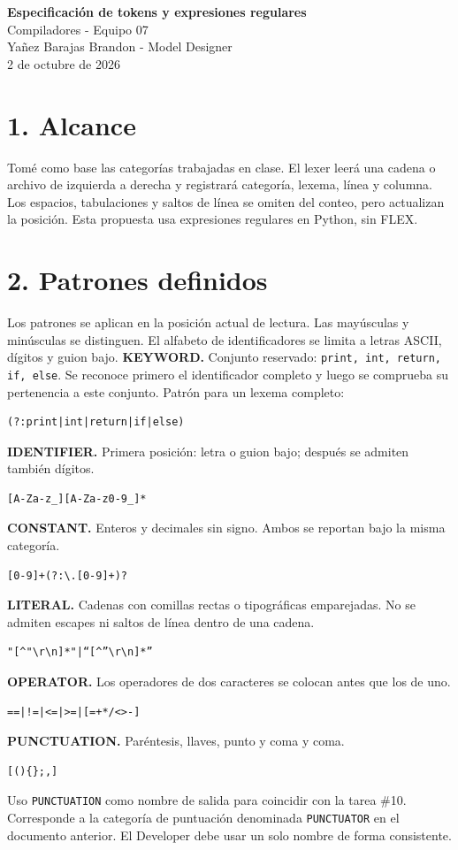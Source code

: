 \documentclass[11pt,letterpaper]{article}
\newcommand{\datos}[1]{\begin{center}{\Large\bfseries\color{navy}#1}\\[8pt]
Compiladores - Equipo 07\\Yañez Barajas Brandon - Model Designer\\2 de octubre de 2026\end{center}}
\newcommand{\tok}[1]{\texttt{#1}}
\begin{document}
\datos{Especificación de tokens y expresiones regulares}
\section*{1. Alcance}
Tomé como base las categorías trabajadas en clase. El lexer leerá una cadena o archivo de izquierda a derecha y registrará categoría, lexema, línea y columna. Los espacios, tabulaciones y saltos de línea se omiten del conteo, pero actualizan la posición. Esta propuesta usa expresiones regulares en Python, sin FLEX.

\section*{2. Patrones definidos}
Los patrones se aplican en la posición actual de lectura. Las mayúsculas y minúsculas se distinguen. El alfabeto de identificadores se limita a letras ASCII, dígitos y guion bajo.
\textbf{KEYWORD.} Conjunto reservado: \tok{print, int, return, if, else}. Se reconoce primero el identificador completo y luego se comprueba su pertenencia a este conjunto. Patrón para un lexema completo:
\begin{verbatim}
(?:print|int|return|if|else)
\end{verbatim}
\textbf{IDENTIFIER.} Primera posición: letra o guion bajo; después se admiten también dígitos.
\begin{verbatim}
[A-Za-z_][A-Za-z0-9_]*
\end{verbatim}
\textbf{CONSTANT.} Enteros y decimales sin signo. Ambos se reportan bajo la misma categoría.
\begin{verbatim}
[0-9]+(?:\.[0-9]+)?
\end{verbatim}
\textbf{LITERAL.} Cadenas con comillas rectas o tipográficas emparejadas. No se admiten escapes ni saltos de línea dentro de una cadena.
\begin{verbatim}
"[^"\r\n]*"|“[^”\r\n]*”
\end{verbatim}
\textbf{OPERATOR.} Los operadores de dos caracteres se colocan antes que los de uno.
\begin{verbatim}
==|!=|<=|>=|[=+*/<>-]
\end{verbatim}
\textbf{PUNCTUATION.} Paréntesis, llaves, punto y coma y coma.
\begin{verbatim}
[(){};,]
\end{verbatim}
Uso \tok{PUNCTUATION} como nombre de salida para coincidir con la tarea \#10. Corresponde a la categoría de puntuación denominada \tok{PUNCTUATOR} en el documento anterior. El Developer debe usar un solo nombre de forma consistente.
\end{document}
